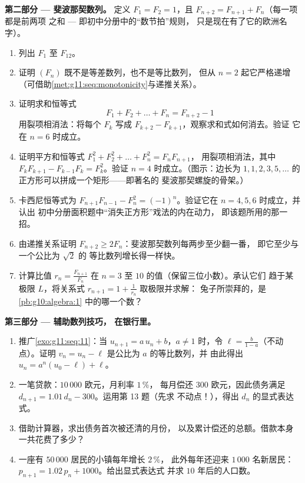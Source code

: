 \begin{problem}
\medskip
\noindent\textbf{第二部分 --- 斐波那契数列。}
定义 $F_1 = F_2 = 1$，且 $F_{n+2} = F_{n+1} + F_n$（每一项都是前两项
之和 --- 即初中分册中的“数节拍”规则，
只是现在有了它的欧洲名字）。
\begin{enumerate}[resume]
  \item 列出 $F_1$ 至 $F_{12}$。
  \item 证明 $(F_n)$ 既不是等差数列，也不是等比数列，
        但从 $n = 2$ 起它严格递增
        （可借助\cref{met:g11:seq:monotonicity}与递推关系）。
  \item 证明求和恒等式
        \[
        F_1 + F_2 + \dots + F_n = F_{n+2} - 1
        \]
        用裂项相消法：将每个 $F_k$ 写成
        $F_{k+2} - F_{k+1}$，观察求和式如何消去。验证
        它在 $n = 6$ 时成立。
  \item 证明平方和恒等式
        $F_1^2 + F_2^2 + \dots + F_n^2 = F_n F_{n+1}$，
        用裂项相消法，其中
        $F_k F_{k+1} - F_{k-1} F_k = F_k^2$。验证
        $n = 4$ 时成立。（图示：边长为
        $1, 1, 2, 3, 5, \dots$ 的正方形可以拼成一个矩形——即著名的
        斐波那契螺旋的骨架。）
  \item 卡西尼恒等式为
        $F_{n+1} F_{n-1} - F_n^2 = (-1)^n$。验证它在
        $n = 4, 5, 6$ 时成立，并认出
        初中分册面积题中“消失正方形”戏法的内在动力，
        即该题所用的那一招。
  \item 由递推关系证明
        $F_{n+2} \geq 2 F_n$：斐波那契数列每两步至少翻一番，
        即它至少与一个公比为 $\sqrt2$ 的
        等比数列增长得一样快。
  \item 计算比值 $r_n = \frac{F_{n+1}}{F_n}$ 在
        $n = 3$ 至 $10$ 的值（保留三位小数）。承认它们
        趋于某极限 $L$，将关系式
        $r_{n+1} = 1 + \frac{1}{r_n}$ 取极限并求解：
        兔子所崇拜的，是\cref{pb:g10:algebra:1}
        中的哪一个数？
\end{enumerate}

\medskip
\noindent\textbf{第三部分 --- 辅助数列技巧，
在银行里。}
\begin{enumerate}[resume]
  \item 推广\cref{exo:g11:seq:11}：当
        $u_{n+1} = a\,u_n + b$，$a \neq 1$ 时，令
        $\ell = \frac{b}{1 - a}$（不动点）。证明
        $v_n = u_n - \ell$ 是公比为 $a$ 的等比数列，并
        由此得出
        $u_n = a^n (u_0 - \ell) + \ell$。
  \item 一笔贷款：$10\,000$ 欧元，月利率 $1\,\%$，
        每月偿还 $300$ 欧元，因此债务满足
        $d_{n+1} = 1.01\,d_n - 300$。运用第 13 题（先求
        不动点！），得出 $d_n$ 的显式表达式。
  \item 借助计算器，求出债务首次被还清的月份，
        以及累计偿还的总额。借款本身
        一共花费了多少？
  \item 一座有 $50\,000$ 居民的小镇每年增长 $2\,\%$，
        此外每年还迎来 $1\,000$ 名新居民：
        $p_{n+1} = 1.02\,p_n + 1000$。给出显式表达式
        并求 $10$ 年后的人口数。
\end{enumerate}


\end{problem}
